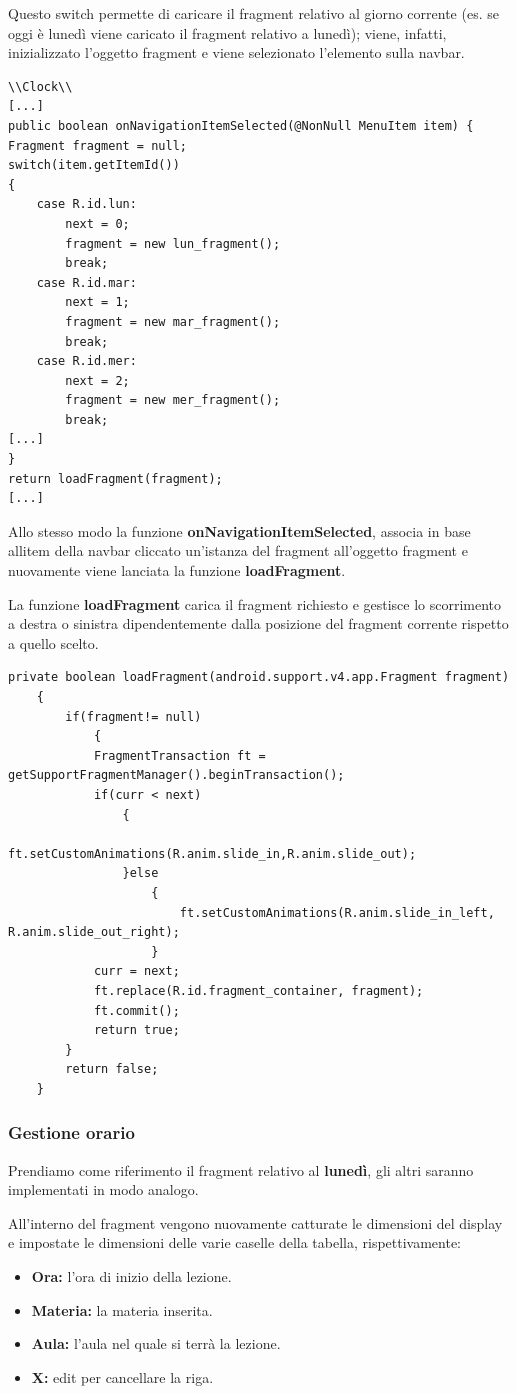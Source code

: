 \documentclass[a4paper, 50pt, twoside]{article}
\begin{document}
Questo switch permette di caricare il fragment relativo al giorno corrente (es. se oggi è lunedì viene caricato il fragment relativo a lunedì); viene, infatti, inizializzato l'oggetto fragment e viene selezionato l'elemento sulla navbar.

\begin{lstlisting}
\\Clock\\
[...]
public boolean onNavigationItemSelected(@NonNull MenuItem item) {
Fragment fragment = null;
switch(item.getItemId())
{
	case R.id.lun:
		next = 0;
		fragment = new lun_fragment();
		break;
	case R.id.mar:
		next = 1;
		fragment = new mar_fragment();
		break;
	case R.id.mer:
		next = 2;
		fragment = new mer_fragment();
		break;
[...]
}
return loadFragment(fragment);
[...]
\end{lstlisting}

Allo stesso modo la funzione \textbf{onNavigationItemSelected}, associa in base allitem della navbar cliccato un'istanza del fragment all'oggetto fragment e nuovamente viene lanciata la funzione \textbf{loadFragment}.

La funzione \textbf{loadFragment} carica il fragment richiesto e gestisce lo scorrimento a destra o sinistra dipendentemente dalla posizione del fragment corrente rispetto a quello scelto.
\begin{lstlisting}
private boolean loadFragment(android.support.v4.app.Fragment fragment)
    {
        if(fragment!= null)
            {
            FragmentTransaction ft = 
getSupportFragmentManager().beginTransaction();
            if(curr < next)
                {
                    ft.setCustomAnimations(R.anim.slide_in,R.anim.slide_out);
                }else
                    {
                        ft.setCustomAnimations(R.anim.slide_in_left,
R.anim.slide_out_right);
                    }
            curr = next;
            ft.replace(R.id.fragment_container, fragment);
            ft.commit();
            return true;
        }
        return false;
    }
\end{lstlisting}
\subsubsection{Gestione orario}
Prendiamo come riferimento il fragment relativo al \textbf{lunedì}, gli altri saranno implementati in modo analogo.

All'interno del fragment vengono nuovamente catturate le dimensioni del display e impostate le dimensioni delle varie caselle della tabella, rispettivamente:
\begin{itemize}
\item \textbf{Ora:} l'ora di inizio della lezione.
\item \textbf{Materia:} la materia inserita.
\item \textbf{Aula:} l'aula nel quale si terrà la lezione.
\item \textbf{X:} edit per cancellare la riga.
\end{itemize}
\end{document}
